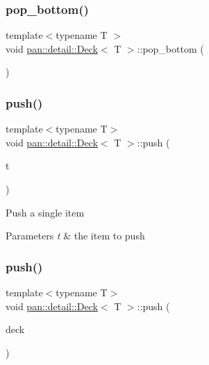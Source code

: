 \mbox{\label{classpan_1_1detail_1_1_deck_a4d5fc95df8f273d0ec51078acd7df69c}} 
\subsubsection{\texorpdfstring{pop\+\_\+bottom()}{pop\_bottom()}}
{\footnotesize\ttfamily template$<$typename T $>$ \\
void \hyperlink{classpan_1_1detail_1_1_deck}{pan\+::detail\+::\+Deck}$<$ T $>$\+::pop\+\_\+bottom (\begin{DoxyParamCaption}{ }\end{DoxyParamCaption})\hspace{0.3cm}{\ttfamily [inline]}}

\mbox{\label{classpan_1_1detail_1_1_deck_a540b0f1829a2783f76dcda346871ec19}} 
\subsubsection{\texorpdfstring{push()}{push()}\hspace{0.1cm}{\footnotesize\ttfamily [1/3]}}
{\footnotesize\ttfamily template$<$typename T$>$ \\
void \hyperlink{classpan_1_1detail_1_1_deck}{pan\+::detail\+::\+Deck}$<$ T $>$\+::push (\begin{DoxyParamCaption}\item[{const T \&}]{t }\end{DoxyParamCaption})}

Push a single item 
\begin{DoxyParams}{Parameters}
{\em t} & the item to push \\
\hline
\end{DoxyParams}
\mbox{\label{classpan_1_1detail_1_1_deck_a27a12aa62ddf019a33922fc8c78425b2}} 
\subsubsection{\texorpdfstring{push()}{push()}\hspace{0.1cm}{\footnotesize\ttfamily [2/3]}}
{\footnotesize\ttfamily template$<$typename T$>$ \\
void \hyperlink{classpan_1_1detail_1_1_deck}{pan\+::detail\+::\+Deck}$<$ T $>$\+::push (\begin{DoxyParamCaption}\item[{const \hyperlink{classpan_1_1detail_1_1_deck}{Deck}$<$ T $>$ \&}]{deck }\end{DoxyParamCaption})}

